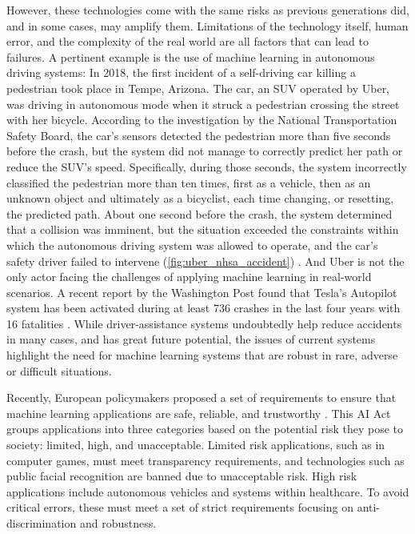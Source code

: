 However, these technologies come with the same risks as previous generations did, and in some cases, may amplify them. 
Limitations of the technology itself, human error, and the complexity of the real world are all factors that can lead to failures. A pertinent example is the use of machine learning in autonomous driving systems: 
In 2018, the first incident of a self-driving car killing a pedestrian took place in Tempe, Arizona. 
The car, an SUV operated by Uber, was driving in autonomous mode when it struck a pedestrian crossing the street with her bicycle. 
According to the investigation by the National Transportation Safety Board, the car's sensors detected the pedestrian more than five seconds before the crash, but the system did not manage to correctly predict her path or reduce the SUV's speed. 
Specifically, during those seconds, the system incorrectly classified the pedestrian more than ten times, first as a vehicle, then as an unknown object and ultimately as a bicyclist, each time changing, or resetting, the predicted path. 
About one second before the crash, the system determined that a collision was imminent, but the situation exceeded the constraints within which the autonomous driving system was allowed to operate, and the car's safety driver failed to intervene (\cref{fig:uber_nhsa_accident}) \parencite{nationaltransportationsafetyboardnhsa_collision_2019}. 
%
And Uber is not the only actor facing the challenges of applying machine learning in real-world scenarios. A recent report by the Washington Post found that Tesla's Autopilot system has been activated during at least 736 crashes in the last four years with 16 fatalities \parencite{siddiqui_17_2023}. 
While driver-assistance systems undoubtedly help reduce accidents in many cases, and has great future potential, the issues of current systems highlight the need for machine learning systems that are robust in rare, adverse or difficult situations. 


Recently, European policymakers proposed a set of requirements to ensure that machine learning applications are safe, reliable, and trustworthy \parencite{europeancommission_briefing_2021}. 
This AI Act groups applications into three categories based on the potential risk they pose to society: limited, high, and unacceptable. Limited risk applications, such as in computer games, must meet transparency requirements, and technologies such as public facial recognition are banned due to unacceptable risk. 
High risk applications include autonomous vehicles and systems within healthcare. To avoid critical errors, these must meet a set of strict requirements focusing on anti-discrimination and robustness.


